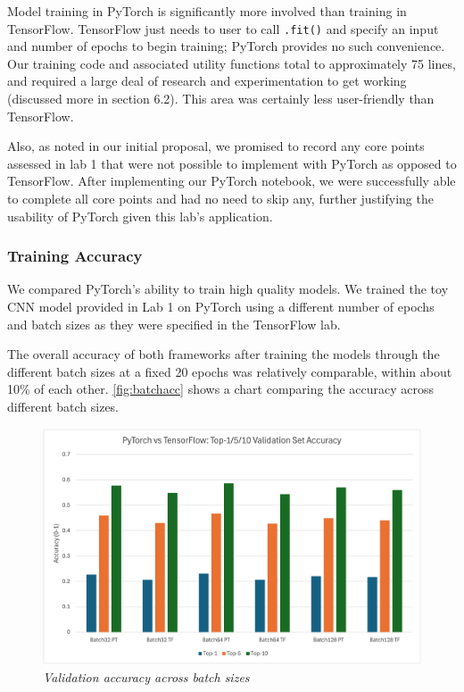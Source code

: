 \documentclass[letterpaper,twocolumn,10pt]{article}
\begin{document}
Model training in PyTorch is significantly more involved than training in TensorFlow. TensorFlow just needs to user to call \verb|.fit()| and specify an input and number of epochs to begin training; PyTorch provides no such convenience. Our training code and associated utility functions total to approximately 75 lines, and required a large deal of research and experimentation to get working (discussed more in section 6.2). This area was certainly less user-friendly than TensorFlow.

Also, as noted in our initial proposal, we promised to record any core points assessed in lab 1 that were not possible to implement with PyTorch as opposed to TensorFlow. After implementing our PyTorch notebook, we were successfully able to complete all core points and had no need to skip any, further justifying the usability of PyTorch given this lab's application.

\subsubsection{Training Accuracy}
We compared PyTorch's ability to train high quality models. We trained the toy CNN model provided in Lab 1 on PyTorch using a different number of epochs and batch sizes as they were specified in the TensorFlow lab.

The overall accuracy of both frameworks after training the models through the different batch sizes at a fixed 20 epochs was relatively comparable, within about 10\% of each other. \autoref{fig:batchacc} shows a chart comparing the accuracy across different batch sizes.

\begin{figure}[ht]
    \centering
    \includegraphics[width=1.0\linewidth]{Figures/Batch_Comp.png}
    \caption{\textit{Validation accuracy across batch sizes}}
    \label{fig:batchacc}
\end{figure}
\end{document}
